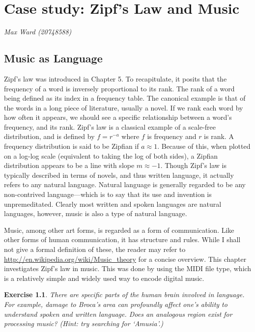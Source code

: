 \documentclass[10pt]{book}
\title{\thetitle}
\author{Allen B. Downey}
\newtheorem{exercise}{Exercise}[chapter]
\begin{document}
\setcounter{chapter}{14}
\chapter{Case study: Zipf's Law and Music}

{\em Max Ward (20748588)}

\section{Music as Language}

Zipf's law was introduced in Chapter 5. To recapitulate, it posits that the frequency of a word is inversely proportional to its rank. The rank of a word being defined as its index in a frequency table. The canonical example is that of the words in a long piece of literature, usually a novel. If we rank each word by how often it appears, we should see a specific relationship between a word's frequency, and its rank. Zipf's law is a classical example of a scale-free distribution, and is defined by $f = r^{-a}$ where $f$ is frequency and $r$ is rank. A frequency distribution is said to be Zipfian if $a \approx 1$. Because of this, when plotted on a log-log scale (equivalent to taking the log of both sides), a Zipfian distribution appears to be a line with slope $m \approx -1$. Though Zipf's law is typically described in terms of novels, and thus written language, it actually refers to any natural language. Natural language is generally regarded to be any non-contrived language---which is to say that its use and invention is unpremeditated. Clearly most written and spoken languages are natural languages, however, music is also a type of natural language.

Music, among other art forms, is regarded as a form of communication. Like other forms of human communication, it has structure and rules. While I shall not give a formal definition of these, the reader may refer to \url{http://en.wikipedia.org/wiki/Music_theory} for a concise overview. This chapter investigates Zipf's law in music. This was done by using the MIDI file type, which is a relatively simple and widely used way to encode digital music.


\begin{exercise}

There are specific parts of the human brain involved in language. For example, damage to Broca's area can profoundly affect one's ability to understand spoken and written language. Does an analogous region exist for processing music? (Hint: try searching for `Amusia'.)

\end{exercise}
\end{document}
